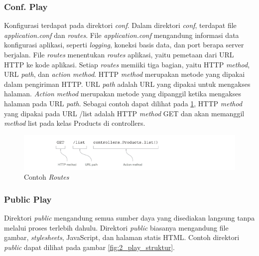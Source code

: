 \subsubsection{Conf. Play}
Konfigurasi \play terdapat pada direktori \textit{conf}. Dalam direktori \textit{conf}, terdapat file \textit{application.conf} dan \textit{routes}. File \textit{application.conf} mengandung informasi data konfigurasi aplikasi, seperti \textit{logging}, koneksi basis data, dan port berapa server berjalan. File \textit{routes} menentukan \textit{routes} aplikasi, yaitu pemetaan dari URL HTTP ke kode aplikasi. Setiap \textit{routes} memiiki tiga bagian, yaitu HTTP \textit{method}, URL \textit{path}, dan \textit{action method}. HTTP \textit{method} merupakan metode yang dipakai dalam pengiriman HTTP. URL \textit{path} adalah URL yang dipakai untuk mengakses halaman. \textit{Action method} merupakan metode  yang dipanggil ketika mengakses halaman pada URL \textit{path}. Sebagai contoh dapat dilihat pada \ref{fig:2_play_routes}, HTTP \textit{method} yang dipakai pada URL /list adalah HTTP \textit{method} GET dan akan memanggil \textit{method} list pada kelas Products di controllers.

\begin{figure}[H]
	\centering
	\includegraphics{Gambar/play-routes}
	\caption{Contoh \textit{Routes}} 
	\label{fig:2_play_routes}
\end{figure}

\subsubsection{Public Play}
Direktori \textit{public} mengandung semua sumber daya yang disediakan langsung tanpa melalui proses terlebih dahulu. Direktori \textit{public} biasanya mengandung file gambar, \textit{stylesheets}, JavaScript, dan halaman statis HTML. Contoh direktori \textit{public} dapat dilihat pada gambar \ref{fig:2_play_struktur}.
%

